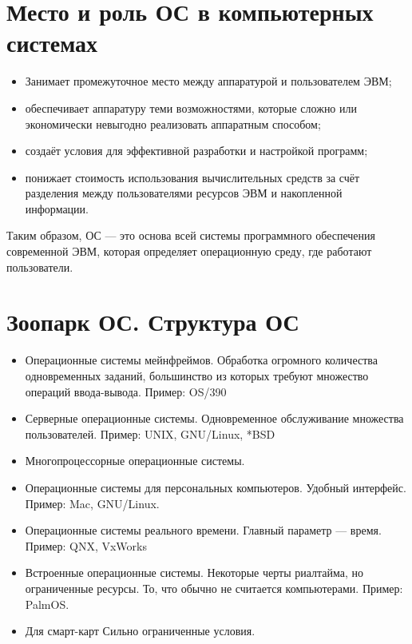\documentclass[a5paper, 10pt, notitlepage, pdftex,headsepline]{scrartcl}
\begin{document}
\section{Место и роль ОС в компьютерных системах}
  \begin{itemize}
    \item Занимает промежуточное место между аппаратурой и пользователем
      ЭВМ;
    \item обеспечивает аппаратуру теми возможностями, которые сложно или
      экономически невыгодно реализовать аппаратным способом;
    \item создаёт условия для эффективной разработки и настройкой
      программ;
    \item понижает стоимость использования вычислительных средств за
      счёт разделения между пользователями ресурсов ЭВМ и накопленной
      информации.
  \end{itemize}

  Таким образом, ОС --- это основа всей системы программного обеспечения
  современной ЭВМ, которая определяет операционную среду, где работают
  пользователи.
\section{Зоопарк ОС. Структура ОС}
  \begin{itemize}
    \item Операционные системы мейнфреймов.
      Обработка огромного количества одновременных заданий, большинство из которых требуют множество операций ввода-вывода.
      Пример: OS/390
    \item Серверные операционные системы.
      Одновременное обслуживание множества пользователей.
      Пример: UNIX, GNU/Linux, *BSD
    \item Многопроцессорные операционные системы.
    \item Операционные системы для персональных компьютеров.
      Удобный интерфейс.
      Пример: Mac, GNU/Linux.
    \item Операционные системы реального времени.
      Главный параметр --- время.
      Пример: QNX, VxWorks
    \item Встроенные операционные системы.
      Некоторые черты риалтайма, но ограниченные ресурсы.
      То, что обычно не считается компьютерами.
      Пример: PalmOS.
    \item Для смарт-карт
      Сильно ограниченные условия.

  \end{itemize}
\end{document}
